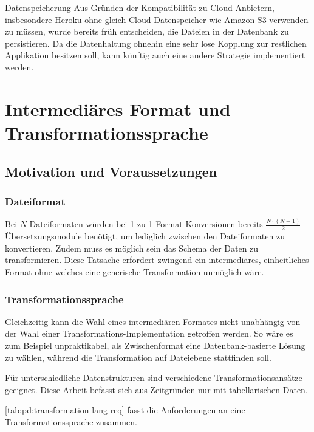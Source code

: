 \begin{decision}[label=dec:pd:datenspeicherung]{Datenspeicherung}
Aus Gründen der Kompatibilität zu Cloud-Anbietern, insbesondere Heroku ohne gleich Cloud-Datenspeicher wie Amazon S3 verwenden zu müssen, wurde bereits früh entscheiden, die Dateien in der Datenbank zu persistieren. Da die Datenhaltung ohnehin eine sehr lose Kopplung zur restlichen Applikation besitzen soll, kann künftig auch eine andere Strategie implementiert werden.
\end{decision}

\section{Intermediäres Format und Transformationssprache}

\subsection{Motivation und Voraussetzungen}

\subsubsection{Dateiformat}
Bei $N$ Dateiformaten würden bei 1-zu-1 Format-Konversionen bereits $\frac{N\cdot(N-1)}2$ Übersetzungsmodule benötigt, um lediglich zwischen den Dateiformaten zu konvertieren. Zudem muss es möglich sein das Schema der Daten zu transformieren. Diese Tatsache erfordert zwingend ein intermediäres, einheitliches Format ohne welches eine generische Transformation unmöglich wäre.

\subsubsection{Transformationssprache}
Gleichzeitig kann die Wahl eines intermediären Formates nicht unabhängig von der Wahl einer Transformations-Implementation getroffen werden. So wäre es zum Beispiel unpraktikabel, als Zwischenformat eine Datenbank-basierte Lösung zu wählen, während die Transformation auf Dateiebene stattfinden soll.

Für unterschiedliche Datenstrukturen sind verschiedene Transformationsansätze geeignet. Diese Arbeit befasst sich aus Zeitgründen nur mit tabellarischen Daten. 

\cref{tab:pd:transformation-lang-req} fasst die Anforderungen an eine Transformationssprache zusammen.

